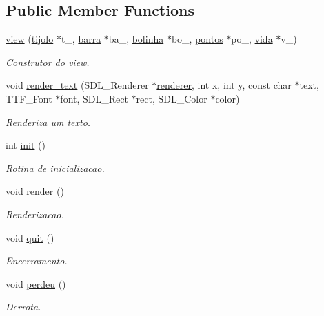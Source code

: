 \subsection*{Public Member Functions}
\begin{DoxyCompactItemize}
\item 
\hyperlink{classview_a95b782bfe0890878f5740f63d7cd89ba}{view} (\hyperlink{classtijolo}{tijolo} $\ast$t\+\_\+, \hyperlink{classbarra}{barra} $\ast$ba\+\_\+, \hyperlink{classbolinha}{bolinha} $\ast$bo\+\_\+, \hyperlink{classpontos}{pontos} $\ast$po\+\_\+, \hyperlink{classvida}{vida} $\ast$v\+\_\+)
\begin{DoxyCompactList}\small\item\em Construtor do view. \end{DoxyCompactList}\item 
void \hyperlink{classview_afa73cff596b36c7009ee17383d039750}{render\+\_\+text} (S\+D\+L\+\_\+\+Renderer $\ast$\hyperlink{classview_a8d7b3ec0a0641d24cdc3b04949f5df45}{renderer}, int x, int y, const char $\ast$text, T\+T\+F\+\_\+\+Font $\ast$font, S\+D\+L\+\_\+\+Rect $\ast$rect, S\+D\+L\+\_\+\+Color $\ast$color)
\begin{DoxyCompactList}\small\item\em Renderiza um texto. \end{DoxyCompactList}\item 
int \hyperlink{classview_a21d953772b41dd9c08c9ea9895e002d7}{init} ()
\begin{DoxyCompactList}\small\item\em Rotina de inicializacao. \end{DoxyCompactList}\item 
void \hyperlink{classview_a91e9b24e39a9846a7093949c9a19a118}{render} ()
\begin{DoxyCompactList}\small\item\em Renderizacao. \end{DoxyCompactList}\item 
void \hyperlink{classview_ad8c046a243e52ee4f902abec6fbec9bb}{quit} ()
\begin{DoxyCompactList}\small\item\em Encerramento. \end{DoxyCompactList}\item 
void \hyperlink{classview_a1839c52cc61779be195b51e4fddcb659}{perdeu} ()
\begin{DoxyCompactList}\small\item\em Derrota. \end{DoxyCompactList}\item 

\end{DoxyCompactItemize}
